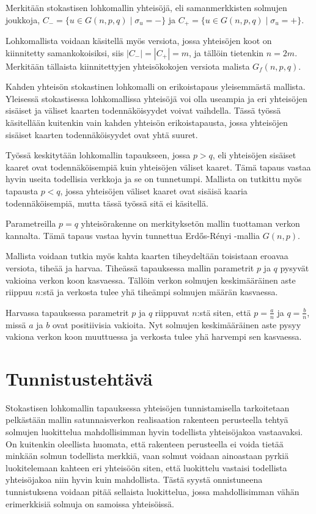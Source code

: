 \documentclass[finnish,12pt,a4paper,pdftex,sci,utf8]{aaltothesis}
\begin{document}
Merkitään stokastisen lohkomallin yhteisöjä, eli samanmerkkisten solmujen joukkoja, $C_- = \{u \in G(n,p,q) \mid \sigma_u = -\}$ ja $C_+ = \{u \in G(n,p,q) \mid \sigma_u = +\}$.

Lohkomallista voidaan käsitellä myös versiota, jossa yhteisöjen koot on kiinnitetty samankokoisiksi, siis $|C_-| = |C_+| = m$, ja tällöin tietenkin $n = 2m$. Merkitään tällaista kiinnitettyjen yhteisökokojen versiota malista $G_f(n,p,q)$.

Kahden yhteisön stokastinen lohkomalli on erikoistapaus yleisemmästä mallista. Yleisessä stokastisessa lohkomallissa yhteisöjä voi olla useampia ja eri yhteisöjen sisäiset ja väliset kaarten todennäköisyydet voivat vaihdella. Tässä työssä käsitellään kuitenkin vain kahden yhteisön erikoistapausta, jossa yhteisöjen sisäiset kaarten todennäköisyydet ovat yhtä suuret.

Työssä keskitytään lohkomallin tapaukseen, jossa $p > q$, eli yhteisöjen sisäiset kaaret ovat todennäköisempiä kuin yhteisöjen väliset kaaret. Tämä tapaus vastaa hyvin useita todellisia verkkoja ja se on tunnetumpi. Mallista on tutkittu myös tapausta $p < q$, jossa yhteisöjen väliset kaaret ovat sisäisä kaaria todennäköisempiä, mutta tässä työssä sitä ei käsitellä.

Parametreilla $p = q$ yhteisörakenne on merkityksetön mallin tuottaman verkon kannalta. Tämä tapaus vastaa hyvin tunnettua Erdős-Rényi -mallia $G(n,p)$.

Mallista voidaan tutkia myös kahta kaarten tiheydeltään toisistaan eroavaa versiota, tiheää ja harvaa. Tiheässä tapauksessa mallin parametrit $p$ ja $q$ pysyvät vakioina verkon koon kasvaessa. Tällöin verkon solmujen keskimääräinen aste riippuu $n$:stä ja verkosta tulee yhä tiheämpi solmujen määrän kasvaessa.

Harvassa tapauksessa parametrit $p$ ja $q$ riippuvat $n$:stä siten, että $p = \frac{a}{n}$ ja $q = \frac{b}{n}$, missä $a$ ja $b$ ovat positiivisia vakioita. Nyt solmujen keskimääräinen aste pysyy vakiona verkon koon muuttuessa ja verkosta tulee yhä harvempi sen kasvaessa.

\clearpage

\section{Tunnistustehtävä}

Stokastisen lohkomallin tapauksessa yhteisöjen tunnistamisella tarkoitetaan pelkästään mallin satunnaisverkon realisaation rakenteen perusteella tehtyä solmujen luokittelua mahdollisimman hyvin todellista yhteisöjakoa vastaavaksi. On kuitenkin oleellista huomata, että rakenteen perusteella ei voida tietää minkään solmun todellista merkkiä, vaan solmut voidaan ainoastaan pyrkiä luokitelemaan kahteen eri yhteisöön siten, että luokittelu vastaisi todellista yhteisöjakoa niin hyvin kuin mahdollista. Tästä syystä onnistuneena tunnistuksena voidaan pitää sellaista luokittelua, jossa mahdollisimman vähän erimerkkisiä solmuja on samoissa yhteisöissä.
\end{document}
